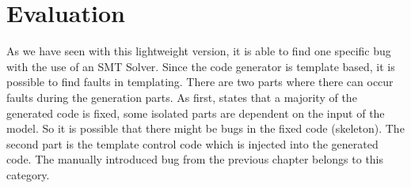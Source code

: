 \section{Evaluation}
\label{sec:ch3-evalution}
As we have seen with this lightweight version, it is able to find one specific bug with the use of an SMT Solver. Since the code generator is template based, it is possible to find faults in templating. There are two parts where there can occur faults during the generation parts. As first, \cite[p.274]{voelter2013dsl} states that a majority of the generated code is fixed, some isolated parts are dependent on the input of the model. So it is possible that there might be bugs in the fixed code (skeleton). The second part is the template control code which is injected into the generated code. The manually introduced bug from the previous chapter belongs  to this category. 


